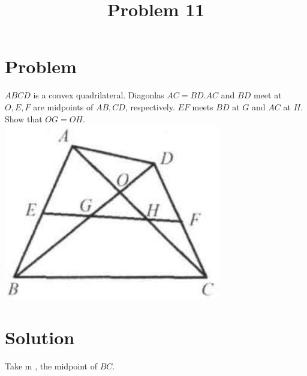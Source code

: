 \documentclass{article}
\title{Problem 11}
\date{}
\begin{document}
\maketitle

\section*{Problem}
\(A B C D\) is a convex quadrilateral. Diagonlas \(A C=B D . A C\) and \(B D\) meet at \(O, E, F\) are midpoints of \(A B, C D\), respectively. \(E F\) meets \(B D\) at \(G\) and \(A C\) at \(H\). Show that \(O G=O H\).\\
\centering
\includegraphics[width=\textwidth]{images/046.jpg}

\section*{Solution}
Take m , the midpoint of \(B C\).
\end{document}
